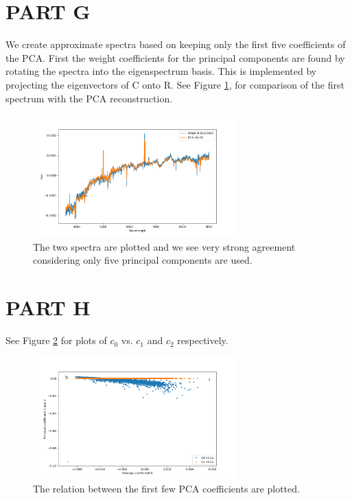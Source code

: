 \documentclass[11pt]{article}
\begin{document}
\section{PART G}
We create approximate spectra based on keeping only the first five coefficients of the PCA. First the weight coefficients for the principal components are found by rotating the spectra into the eigenspectrum basis. This is implemented by projecting the eigenvectors of C onto R. See Figure \ref{PCA}, for comparison of the first spectrum with the PCA reconstruction. 

\begin{figure}[!htbp]
    \centering
    \includegraphics[width=0.7\textwidth]{PCA.png}
    \caption{The two spectra are plotted and we see very strong agreement considering only five principal components are used.}
    \label{PCA}
\end{figure}

\section{PART H}
See Figure \ref{c} for plots of $c_0$ vs. $c_1$ and $c_2$ respectively. 
\begin{figure}[!htbp]
    \centering
    \includegraphics[width=0.7\textwidth]{PCA_C.png}
    \caption{The relation between the first few PCA coefficients are plotted.}
    \label{c}
\end{figure}
\end{document}
